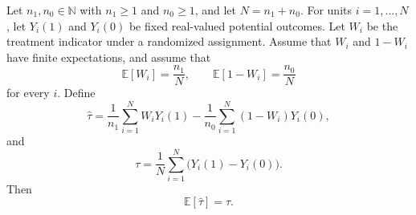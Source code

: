 \begin{theorem}
Let $n_1,n_0\in\mathbb{N}$ with $n_1\ge 1$ and $n_0\ge 1$, and let
$N=n_1+n_0$. For units $i=1,\ldots,N$, let $Y_i(1)$ and $Y_i(0)$ be fixed
real-valued potential outcomes. Let $W_i$ be the treatment indicator under a
randomized assignment. Assume that $W_i$ and $1-W_i$ have finite expectations,
and assume that
\[
\mathbb{E}[W_i]=\frac{n_1}{N},
\qquad
\mathbb{E}[1-W_i]=\frac{n_0}{N}
\]
for every $i$.
Define
\[
\widehat{\tau}
=
\frac{1}{n_1}\sum_{i=1}^N W_iY_i(1)
-
\frac{1}{n_0}\sum_{i=1}^N (1-W_i)Y_i(0),
\]
and
\[
\tau
=
\frac{1}{N}\sum_{i=1}^N \bigl(Y_i(1)-Y_i(0)\bigr).
\]
Then
\[
\mathbb{E}[\widehat{\tau}]=\tau.
\]
\end{theorem}

